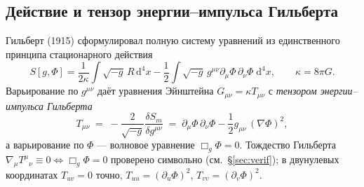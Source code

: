 \documentclass[11pt,a4paper]{article}
\newcommand{\dd}{\mathrm{d}}
\begin{document}
\subsection{Действие и тензор энергии--импульса Гильберта}
Гильберт (1915) сформулировал полную систему уравнений из единственного
принципа стационарного действия
\begin{equation}
S[g,\Phi]=\frac{1}{2\kappa}\int\sqrt{-g}\,R\,\dd^4x
-\frac{1}{2}\int\sqrt{-g}\,g^{\mu\nu}\partial_\mu\Phi\,\partial_\nu\Phi\;\dd^4x,
\qquad \kappa=8\pi G .
\label{eq:action}
\end{equation}
Варьирование по $g^{\mu\nu}$ даёт уравнения Эйнштейна
$G_{\mu\nu}=\kappa T_{\mu\nu}$ с \emph{тензором энергии--импульса Гильберта}
\begin{equation}
T_{\mu\nu}\;=\;-\frac{2}{\sqrt{-g}}\frac{\delta S_m}{\delta g^{\mu\nu}}
\;=\;\partial_\mu\Phi\,\partial_\nu\Phi-\frac12 g_{\mu\nu}\,(\nabla\Phi)^2 ,
\label{eq:hilbert}
\end{equation}
а варьирование по $\Phi$ --- волновое уравнение $\Box_g\Phi=0$. Тождество
Гильберта $\nabla_\mu T^{\mu}{}_{\nu}\equiv0\Leftrightarrow\Box_g\Phi=0$
проверено символьно (см.~\S\ref{sec:verif}); в двунулевых координатах
$T_{uv}=0$ точно, $T_{uu}=(\partial_u\Phi)^2$, $T_{vv}=(\partial_v\Phi)^2$.
\end{document}
